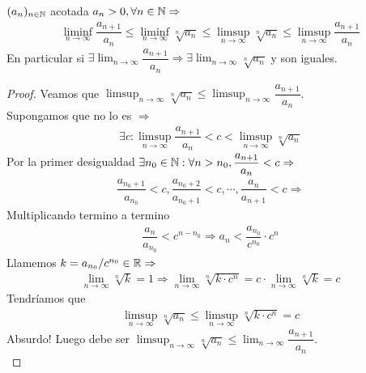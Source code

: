 \begin{theorem}
  $(a_n)_{n \in \mathbb{N}}$ acotada $a_n > 0, \forall n \in \mathbb{N} \Rightarrow$ \begin{align*}
    \liminf_{n \to \infty} \dfrac{a_{n+1}}{a_n} \leq \liminf_{n \to \infty} \sqrt[n]{a_n} \leq \limsup_{n \to \infty} \sqrt[n]{a_n} \leq \limsup_{n \to \infty} \dfrac{a_{n+1}}{a_n}
  \end{align*}
  En particular si $\exists \lim_{n \to \infty} \dfrac{a_{n+1}}{a_n} \Rightarrow \exists \lim_{n \to \infty} \sqrt[n]{a_n}$ y son iguales.

  \begin{proof}
    Veamos que $\limsup_{n \to \infty} \sqrt[n]{a_n} \leq \limsup_{n \to \infty} \dfrac{a_{n+1}}{a_n}$. \\
    Supongamos que no lo es $\Rightarrow$
    \begin{align*}
      \exists c : \limsup_{n \to \infty} \dfrac{a_{n+1}}{a_n} < c < \limsup_{n \to \infty} \sqrt[n]{a_n}
    \end{align*} Por la primer desigualdad $\exists n_0 \in \mathbb{N} : \forall n > n_0, \dfrac{a_{n+1}}{a_n} < c \Rightarrow$ \begin{align*}
      \dfrac{a_{n_0+1}}{a_{n_0}} < c, \dfrac{a_{n_0+2}}{a_{n_0+1}} < c, \cdots, \dfrac{a_n}{a_{n+1}} < c \Rightarrow
    \end{align*}
    Multiplicando termino a termino
    \begin{align*}
      \dfrac{a_n}{a_{n_0}} < c^{n - n_0} \Rightarrow a_n < \dfrac{a_{n_0}}{c^{n_0}} \cdot c^n
    \end{align*} Llamemos $k = a_{n_0}/c^{n_0} \in \mathbb{R} \Rightarrow$ \begin{align*}
      \lim_{n \to \infty} \sqrt[n]{k} = 1 \Rightarrow \lim_{n \to \infty} \sqrt[n]{k \cdot c^n} = c \cdot \lim_{n \to \infty} \sqrt[n]{k} = c
    \end{align*} Tendríamos que \begin{align*}
      \limsup_{n \to \infty} \sqrt[n]{a_n} \leq \limsup_{n \to \infty} \sqrt[n]{k \cdot c^n} = c
    \end{align*} Absurdo!
    Luego debe ser $\limsup_{n \to \infty} \sqrt[n]{a_n} \leq \lim_{n \to \infty} \dfrac{a_{n+1}}{a_n}$. \\
  \end{proof}
\end{theorem}

\clearpage

